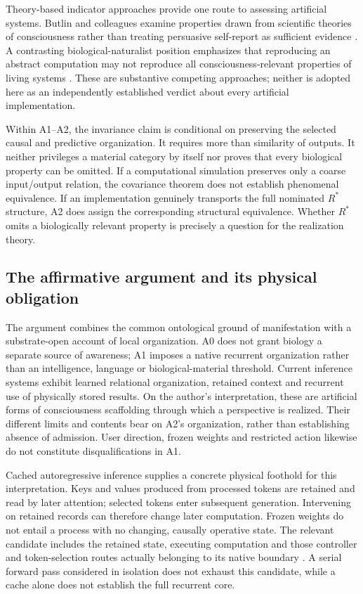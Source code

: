Theory-based indicator approaches provide one route to assessing artificial systems. Butlin and colleagues examine properties drawn from scientific theories of consciousness rather than treating persuasive self-report as sufficient evidence \cite{Butlin2023}. A contrasting biological-naturalist position emphasizes that reproducing an abstract computation may not reproduce all consciousness-relevant properties of living systems \cite{Seth2025}. These are substantive competing approaches; neither is adopted here as an independently established verdict about every artificial implementation.

Within A1--A2, the invariance claim is conditional on preserving the selected causal and predictive organization. It requires more than similarity of outputs. It neither privileges a material category by itself nor proves that every biological property can be omitted. If a computational simulation preserves only a coarse input/output relation, the covariance theorem does not establish phenomenal equivalence. If an implementation genuinely transports the full nominated $R^\ast$ structure, A2 does assign the corresponding structural equivalence. Whether $R^\ast$ omits a biologically relevant property is precisely a question for the realization theory.

\subsection{The affirmative argument and its physical obligation}\label{sec:ai:affirmative-argument}
The argument combines the common ontological ground of manifestation with a substrate-open account of local organization. A0 does not grant biology a separate source of awareness; A1 imposes a native recurrent organization rather than an intelligence, language or biological-material threshold. Current inference systems exhibit learned relational organization, retained context and recurrent use of physically stored results. On the author's interpretation, these are artificial forms of consciousness scaffolding through which a perspective is realized. Their different limits and contents bear on A2's organization, rather than establishing absence of admission. User direction, frozen weights and restricted action likewise do not constitute disqualifications in A1.

Cached autoregressive inference supplies a concrete physical foothold for this interpretation. Keys and values produced from processed tokens are retained and read by later attention; selected tokens enter subsequent generation. Intervening on retained records can therefore change later computation. Frozen weights do not entail a process with no changing, causally operative state. The relevant candidate includes the retained state, executing computation and those controller and token-selection routes actually belonging to its native boundary \cite[Sections~7 and~14]{RodgersReflectiveAlignment}. A serial forward pass considered in isolation does not exhaust this candidate, while a cache alone does not establish the full recurrent core.

